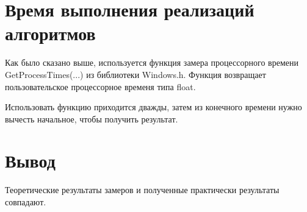 \section{Время выполнения реализаций алгоритмов}

Как было сказано выше, используется функция замера процессорного времени GetProcessTimes(...) из библиотеки Windows.h. Функция возвращает пользовательское процессорное временя типа float.

Использовать функцию приходится дважды, затем из конечного времени нужно вычесть начальное, чтобы получить результат.




\section*{Вывод}


Теоретические результаты замеров и полученные практически результаты совпадают.